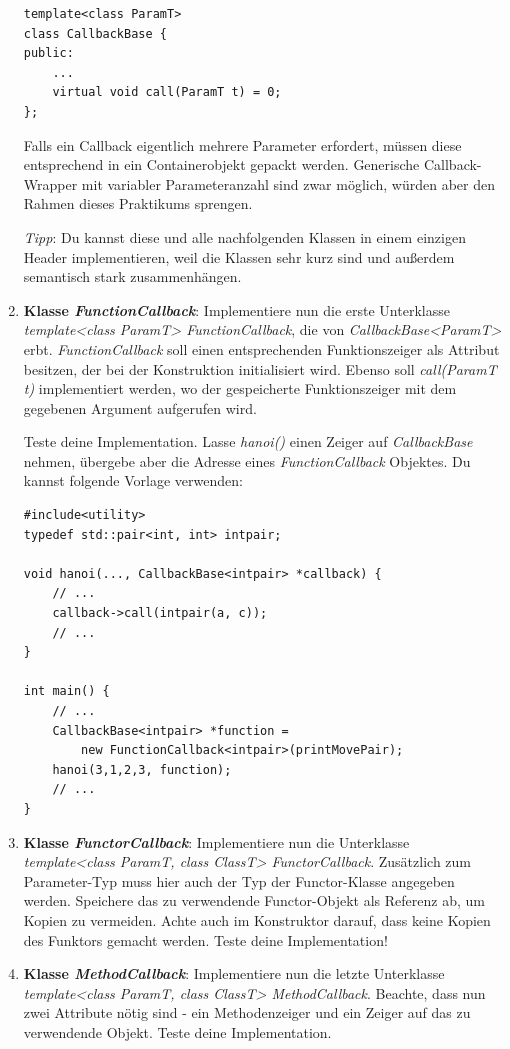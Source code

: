 \begin{enumerate}
\begin{lstlisting}
template<class ParamT>
class CallbackBase {
public:
	...
	virtual void call(ParamT t) = 0;
};
\end{lstlisting}

Falls ein Callback eigentlich mehrere Parameter erfordert, müssen diese entsprechend in ein Containerobjekt gepackt werden.
Generische Callback-Wrapper mit variabler Parameteranzahl sind zwar möglich, würden aber den Rahmen dieses Praktikums sprengen.

\emph{Tipp}: Du kannst diese und alle nachfolgenden Klassen in einem einzigen Header implementieren, weil die Klassen sehr kurz sind und außerdem semantisch stark zusammenhängen.


\item
\textbf{Klasse \emph{FunctionCallback}}:
Implementiere nun die erste Unterklasse \emph{template<class ParamT> FunctionCallback}, die von \emph{CallbackBase<ParamT>} erbt.  \emph{FunctionCallback} soll einen entsprechenden Funktionszeiger als Attribut besitzen, der bei der Konstruktion initialisiert wird.
Ebenso soll \emph{call(ParamT t)} implementiert werden, wo der gespeicherte Funktionszeiger mit dem gegebenen Argument aufgerufen wird.

Teste deine Implementation.
Lasse \emph{hanoi()} einen Zeiger auf \emph{CallbackBase} nehmen, übergebe aber die Adresse eines \emph{FunctionCallback} Objektes.
Du kannst folgende Vorlage verwenden:
\begin{lstlisting}
#include<utility>
typedef std::pair<int, int> intpair;

void hanoi(..., CallbackBase<intpair> *callback) {
	// ...
	callback->call(intpair(a, c));
	// ...
}

int main() {
	// ...
	CallbackBase<intpair> *function =
	    new FunctionCallback<intpair>(printMovePair);
	hanoi(3,1,2,3, function);
	// ...
}
\end{lstlisting}


\item
\textbf{Klasse \emph{FunctorCallback}}:
Implementiere nun die Unterklasse \emph{template<class ParamT, class ClassT> FunctorCallback}.
Zusätzlich zum Parameter-Typ muss hier auch der Typ der Functor-Klasse angegeben werden.
Speichere das zu verwendende Functor-Objekt als Referenz ab, um Kopien zu vermeiden.
Achte auch im Konstruktor darauf, dass keine Kopien des Funktors gemacht werden.
Teste deine Implementation!



\item
\textbf{Klasse \emph{MethodCallback}}:
Implementiere nun die letzte Unterklasse \emph{template<class ParamT, class ClassT> MethodCallback}.
Beachte, dass nun zwei Attribute nötig sind - ein Methodenzeiger und ein Zeiger auf das zu verwendende Objekt.
Teste deine Implementation.


\end{enumerate}

